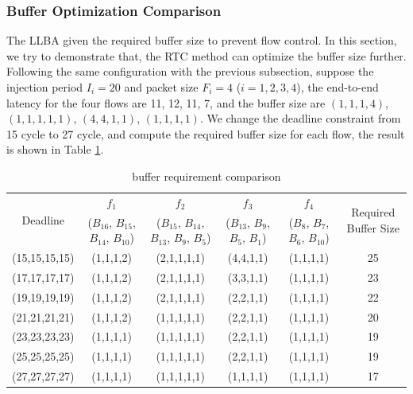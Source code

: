 \documentclass[10pt,journal]{IEEEtran}
\begin{document}
\subsubsection{Buffer Optimization Comparison}
The LLBA \cite{189} given the required buffer size to prevent flow control. In this section, we try to demonstrate that, the RTC method can optimize the buffer size further. Following the same configuration with the previous subsection, suppose the injection period $I_i=20$ and packet size $F_i=4$ ($i=1,2,3,4$), the end-to-end latency for the four flows are 11, 12, 11, 7, and the buffer size are $(1,1,1,4)$, $(1,1,1,1,1)$, $(4,4,1,1)$, $(1,1,1,1)$. We change the deadline constraint from 15 cycle to 27 cycle, and compute the required buffer size for each flow, the result is shown in Table \ref{LLBAvsRTC}.
\begin{table}[htbp]
\centering
\caption{\label{LLBAvsRTC}buffer requirement comparison}
\begin{tabular}{|c|c|c|c|c|c|}
\hline
\multirow{2}{*}{Deadline}  & $f_1$  &   $f_2$   &   $f_3$   &   $f_4$   &   \multirow{2}{*}{Required Buffer Size} \\
($D_1$, $D_2$, $D_3$, $D_4$)    &   ($B_{16}$, $B_{15}$, $B_{14}$, $B_{10}$)  &   ($B_{15}$, $B_{14}$, $B_{13}$, $B_{9}$, $B_5$)  & ($B_{13}$, $B_{9}$, $B_{5}$, $B_{1}$)   &    ($B_{8}$, $B_{7}$, $B_{6}$, $B_{10}$)   &   \\
\hline
(15,15,15,15)   &   (1,1,1,2)   &   (2,1,1,1,1) &   (4,4,1,1)   &   (1,1,1,1)   &   25\\
\hline
(17,17,17,17)   &   (1,1,1,2)   &   (2,1,1,1,1) &   (3,3,1,1)   &   (1,1,1,1)   &   23\\
\hline
(19,19,19,19)   &   (1,1,1,2)   &   (2,1,1,1,1) &   (2,2,1,1)   &   (1,1,1,1)   &   22\\
\hline
(21,21,21,21)   &   (1,1,1,2)   &   (1,1,1,1,1) &   (2,2,1,1)   &   (1,1,1,1)   &   20\\
\hline
(23,23,23,23)   &   (1,1,1,1)   &   (1,1,1,1,1) &   (2,2,1,1)   &   (1,1,1,1)   &   19\\
\hline
(25,25,25,25)   &   (1,1,1,1)   &   (1,1,1,1,1) &   (2,2,1,1)   &   (1,1,1,1)   &   19\\
\hline
(27,27,27,27)   &   (1,1,1,1)   &   (1,1,1,1,1) &   (1,1,1,1)   &   (1,1,1,1)   &   17\\
\hline
\end{tabular}
\end{table}
\end{document}

